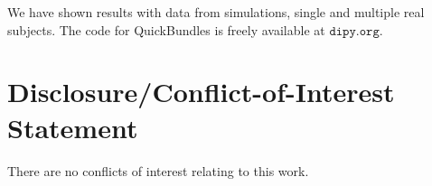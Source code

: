 \documentclass{bioinfo}
\begin{document}
We have shown results with data from simulations, single and multiple
real subjects. The code for QuickBundles is freely available at
$\texttt{dipy.org}$.

\section*{Disclosure/Conflict-of-Interest Statement}
There are no conflicts of interest relating to this work.

%

%
%
%

\end{document}
